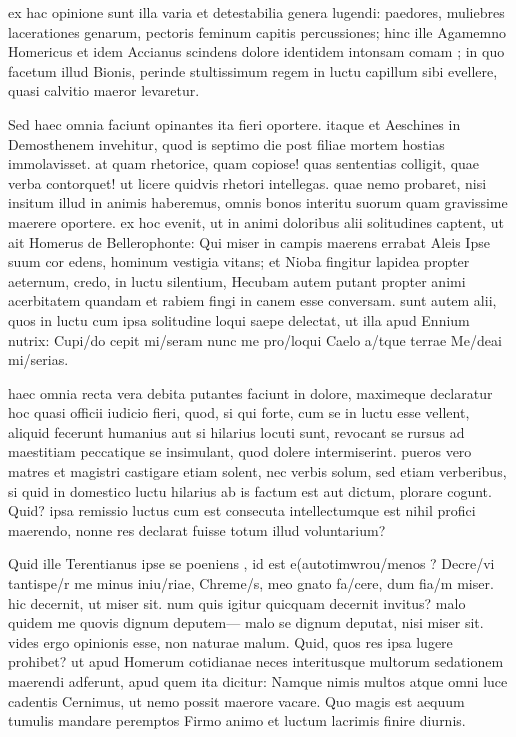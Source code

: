  ex hac opinione sunt illa varia et detestabilia genera lugendi: paedores, muliebres lacerationes genarum, pectoris feminum capitis percussiones; hinc ille Agamemno Homericus et idem Accianus scindens dolore identidem intonsam comam ; in quo facetum illud Bionis, perinde stultissimum regem in luctu capillum sibi evellere, quasi calvitio maeror levaretur.

 Sed haec omnia faciunt opinantes ita fieri oportere. itaque et Aeschines in Demosthenem invehitur, quod is septimo die post filiae mortem hostias immolavisset. at quam rhetorice, quam copiose! quas sententias colligit, quae verba contorquet! ut licere quidvis rhetori intellegas. quae nemo probaret, nisi insitum illud in animis haberemus, omnis bonos interitu suorum quam gravissime maerere oportere. ex hoc evenit, ut in animi doloribus alii solitudines captent, ut ait Homerus de Bellerophonte: Qui miser in campis maerens errabat Aleis Ipse suum cor edens, hominum vestigia vitans; et Nioba fingitur lapidea propter aeternum, credo, in luctu silentium, Hecubam autem putant propter animi acerbitatem quandam et rabiem fingi in canem esse conversam. sunt autem alii, quos in luctu cum ipsa solitudine loqui saepe delectat, ut illa apud Ennium nutrix: Cupi/do cepit mi/seram nunc me pro/loqui Caelo a/tque terrae Me/deai mi/serias.

 haec omnia recta vera debita putantes faciunt in dolore, maximeque declaratur hoc quasi officii iudicio fieri, quod, si qui forte, cum se in luctu esse vellent, aliquid fecerunt humanius aut si hilarius locuti sunt, revocant se rursus ad maestitiam peccatique se insimulant, quod dolere intermiserint. pueros vero matres et magistri castigare etiam solent, nec verbis solum, sed etiam verberibus, si quid in domestico luctu hilarius ab is factum est aut dictum, plorare cogunt. Quid? ipsa remissio luctus cum est consecuta intellectumque est nihil profici maerendo, nonne res declarat fuisse totum illud voluntarium?

 Quid ille Terentianus ipse se poeniens , id est e(auto\n timwrou/menos ? Decre/vi tantispe/r me minus iniu/riae, Chreme/s, meo gnato fa/cere, dum fia/m miser. hic decernit, ut miser sit. num quis igitur quicquam decernit invitus? malo quidem me quovis dignum deputem— malo se dignum deputat, nisi miser sit. vides ergo opinionis esse, non naturae malum. Quid, quos res ipsa lugere prohibet? ut apud Homerum cotidianae neces interitusque multorum sedationem maerendi adferunt, apud quem ita dicitur: Namque nimis multos atque omni luce cadentis Cernimus, ut nemo possit maerore vacare. Quo magis est aequum tumulis mandare peremptos Firmo animo et luctum lacrimis finire diurnis.

